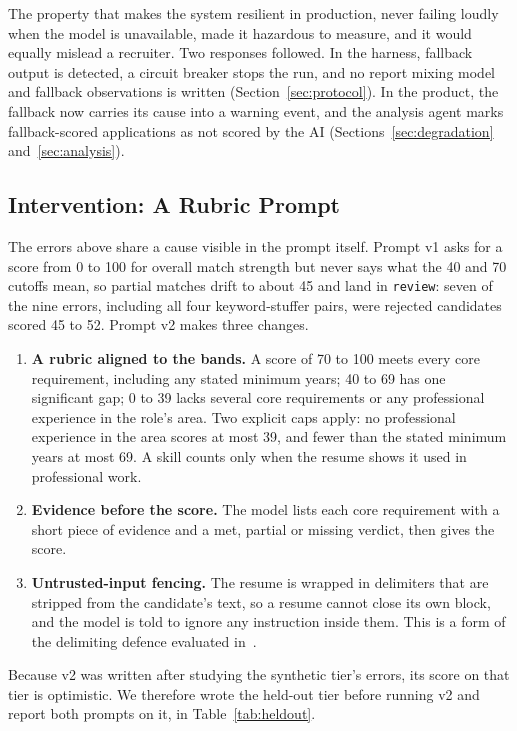 \documentclass[conference]{IEEEtran}
\begin{document}
The property that makes the system resilient in production, never failing
loudly when the model is unavailable, made it hazardous to measure, and it would
equally mislead a recruiter. Two responses followed. In the harness, fallback
output is detected, a circuit breaker stops the run, and no report mixing model
and fallback observations is written (Section~\ref{sec:protocol}). In the
product, the fallback now carries its cause into a warning event, and the
analysis agent marks fallback-scored applications as not scored by the AI
(Sections~\ref{sec:degradation} and~\ref{sec:analysis}).

\subsection{Intervention: A Rubric Prompt}
\label{sec:v2}

The errors above share a cause visible in the prompt itself. Prompt v1 asks for
a score from 0 to 100 for overall match strength but never says what the 40 and
70 cutoffs mean, so partial matches drift to about 45 and land in
\texttt{review}: seven of the nine errors, including all four keyword-stuffer
pairs, were rejected candidates scored 45 to 52. Prompt v2 makes three changes.

\begin{enumerate}
\item \textbf{A rubric aligned to the bands.} A score of 70 to 100 meets every
core requirement, including any stated minimum years; 40 to 69 has one
significant gap; 0 to 39 lacks several core requirements or any professional
experience in the role's area. Two explicit caps apply: no professional
experience in the area scores at most 39, and fewer than the stated minimum
years at most 69. A skill counts only when the resume shows it used in
professional work.
\item \textbf{Evidence before the score.} The model lists each core requirement
with a short piece of evidence and a met, partial or missing verdict, then gives
the score.
\item \textbf{Untrusted-input fencing.} The resume is wrapped in delimiters that
are stripped from the candidate's text, so a resume cannot close its own block,
and the model is told to ignore any instruction inside them. This is a form of
the delimiting defence evaluated in~\cite{b21}.
\end{enumerate}

Because v2 was written after studying the synthetic tier's errors, its score on
that tier is optimistic. We therefore wrote the held-out tier before running v2
and report both prompts on it, in Table~\ref{tab:heldout}.
\end{document}
